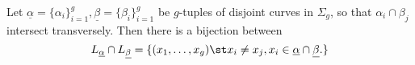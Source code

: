 

    Let $\underline \alpha = \{\alpha_i\}_{i=1}^g, \underline \beta = \{\beta_i\}_{i=1}^g$ be $g$-tuples of disjoint curves in $\Sigma_g$, so that $\alpha_i\cap \beta_j$ intersect transversely. Then there is a bijection between
    \[L_{\underline \alpha}\cap L_{\underline \beta} = \{(x_1, \ldots, x_g)\st x_i\neq x_j, x_i \in \underline \alpha \cap \underline \beta.\}\]
